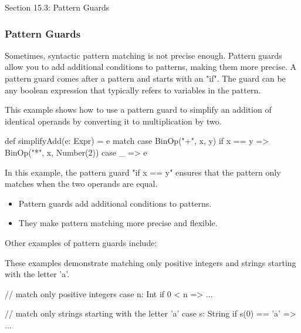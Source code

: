 \begin{notes}{Section 15.3: Pattern Guards}
\begin{highlight}
    \end{highlight}
    
    \subsubsection*{Pattern Guards}
    
    Sometimes, syntactic pattern matching is not precise enough. Pattern guards allow you to add additional conditions to patterns, making them more precise. A pattern guard comes after a pattern and 
    starts with an "if". The guard can be any boolean expression that typically refers to variables in the pattern.
    
    \begin{highlight}
    
        This example shows how to use a pattern guard to simplify an addition of identical operands by converting it to multiplication by two.
    
    \begin{code}[Scala]
    def simplifyAdd(e: Expr) = e match {
        case BinOp("+", x, y) if x == y => BinOp("*", x, Number(2))
        case _ => e
    }
    \end{code}
    
        In this example, the pattern guard "if x == y" ensures that the pattern only matches when the two operands are equal.
    
        \begin{itemize}
            \item Pattern guards add additional conditions to patterns.
            \item They make pattern matching more precise and flexible.
        \end{itemize}
    
    \end{highlight}
    
    Other examples of pattern guards include:
    
    \begin{highlight}
    
        These examples demonstrate matching only positive integers and strings starting with the letter 'a'.
    
    \begin{code}[Scala]
    // match only positive integers
    case n: Int if 0 < n => ...
    
    // match only strings starting with the letter 'a'
    case s: String if s(0) == 'a' => ...
    \end{code}
    

\end{highlight}
\end{notes}
